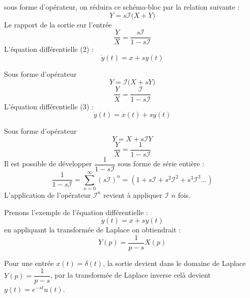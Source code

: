 \documentclass[a4paper,10pt]{article}
\begin{document}
\begin{center}
\end{center}

sous forme d'opérateur, on réduira ce schéma-bloc par la relation suivante :
\[
    Y=s\mathcal{I}\big(X+Y\big)
\]
Le rapport de la sortie sur l'entrée
\[
    \dfrac{Y}{X}=\dfrac{s\mathcal{I}}{1-s\mathcal{I}}
\]
L'équation différentielle (2) :
\[
    \dot{y}(t)=x+sy(t)
\]

\begin{center}
\end{center}

Sous forme d'opérateur
\[
    Y=\mathcal{I}\big(X+sY\big)
\]
\[
    \dfrac{Y}{X}=\dfrac{\mathcal{I}}{1-s\mathcal{I}}
\]
L'équation différentielle (3) :
\[
    \dot{y}(t)=\dot{x}(t)+sy(t)
\]
\begin{center}
\end{center}
Sous forme d'opérateur
\[
    Y=X+s\mathcal{I}Y
\]
\[
    \dfrac{Y}{X}=\dfrac{1}{1-s\mathcal{I}}
\]
Il est possible de développer $\dfrac{1}{1-s\mathcal{I}}$ sous forme de série entière :
\[
    \dfrac{1}{1-s\mathcal{I}}=\sum_{n=0}^{\infty}(s\mathcal{I})^n=(1+s\mathcal{I}+s^2\mathcal{I}^2+s^3\mathcal{I}^3\ldots)
\]
L'application de l'opérateur $\mathcal{I}^n$ revient à appliquer $\mathcal{I}$ $n$ fois.

Prenons l'exemple de l'équation différentielle :
\[
    \dot{y}(t)=x+sy(t)
\]
en appliquant la transformée de Laplace on obtiendrait :
\[
    Y(p)=\dfrac{1}{p-s}X(p)
\]

Pour une entrée $x(t)=\delta(t)$, la sortie devient dans le domaine de Laplace $Y(p)=\dfrac{1}{p-s}$, par la transformée de Laplace
inverse celà devient $y(t)=e^{-st}u(t)$.
\end{document}
